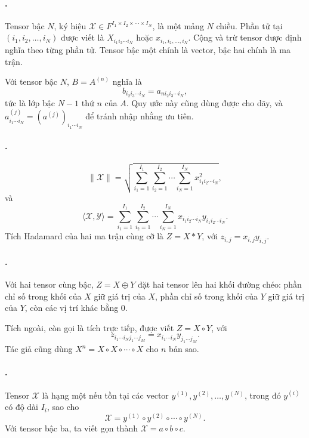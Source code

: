 \documentclass[11pt]{article}
\begin{document}
\paragraph{.}
Tensor bậc \(N\), ký hiệu \(\mathcal X\in F^{I_1\times I_2\times\cdots\times I_N}\),
là một mảng \(N\) chiều. Phần tử tại \((i_1,i_2,\ldots,i_N)\) được viết là
\(X_{i_1i_2\cdots i_N}\) hoặc \(x_{i_1,i_2,\ldots,i_N}\). Cộng và trừ tensor
được định nghĩa theo từng phần tử. Tensor bậc một chính là vector, bậc hai
chính là ma trận.

Với tensor bậc \(N\), \(B=A^{(n)}\) nghĩa là
\[
  b_{i_2i_3\cdots i_N}=a_{n i_2 i_3\cdots i_N},
\]
tức là lớp bậc \(N-1\) thứ \(n\) của \(A\). Quy ước này cũng dùng được cho
dãy, và \(a^{(j)}_{i_1\cdots i_N}=(a^{(j)})_{i_1\cdots i_N}\) để tránh nhập
nhằng ưu tiên.

\paragraph{.}
\[
  \|\mathcal X\|=
  \sqrt{\sum_{i_1=1}^{I_1}\sum_{i_2=1}^{I_2}\cdots
  \sum_{i_N=1}^{I_N}x_{i_1i_2\cdots i_N}^2},
\]
và
\[
  \langle \mathcal X,\mathcal Y\rangle
  =
  \sum_{i_1=1}^{I_1}\sum_{i_2=1}^{I_2}\cdots
  \sum_{i_N=1}^{I_N}
  x_{i_1i_2\cdots i_N}y_{i_1i_2\cdots i_N}.
\]
Tích Hadamard của hai ma trận cùng cỡ là \(Z=X*Y\), với \(z_{i,j}=x_{i,j}y_{i,j}\).

\paragraph{.}
Với hai tensor cùng bậc, \(Z=X\oplus Y\) đặt hai tensor lên hai khối đường chéo:
phần chỉ số trong khối của \(X\) giữ giá trị của \(X\), phần chỉ số trong khối
của \(Y\) giữ giá trị của \(Y\), còn các vị trí khác bằng \(0\).

Tích ngoài, còn gọi là tích trực tiếp, được viết \(Z=X\circ Y\), với
\[
  z_{i_1\cdots i_N j_1\cdots j_M}
  =
  x_{i_1\cdots i_N}y_{j_1\cdots j_M}.
\]
Tác giả cũng dùng \(X^n=X\circ X\circ\cdots\circ X\) cho \(n\) bản sao.

\paragraph{.}
Tensor \(\mathcal X\) là hạng một nếu tồn tại các vector
\(y^{(1)},y^{(2)},\ldots,y^{(N)}\), trong đó \(y^{(i)}\) có độ dài \(I_i\), sao
cho
\[
  \mathcal X=y^{(1)}\circ y^{(2)}\circ\cdots\circ y^{(N)}.
\]
Với tensor bậc ba, ta viết gọn thành \(\mathcal X=a\circ b\circ c\).
\end{document}
